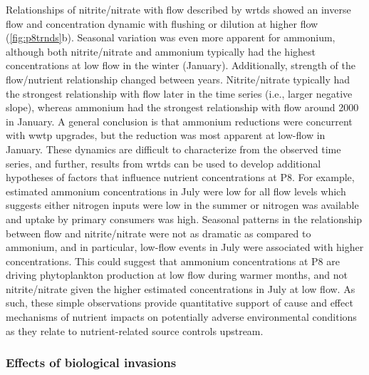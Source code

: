 \documentclass[journal = esthag, manuscript = article]{achemso}\usepackage[]{graphicx}\usepackage[]{color}
\begin{document}
Relationships of nitrite/nitrate with flow described by \ac{wrtds} showed an inverse flow and concentration dynamic with flushing or dilution at higher flow (\cref{fig:p8trnds}b).  Seasonal variation was even more apparent for ammonium, although both nitrite/nitrate and ammonium typically had the highest concentrations at low flow in the winter (January).  Additionally, strength of the flow/nutrient relationship changed between years. Nitrite/nitrate typically had the strongest relationship with flow later in the time series (i.e., larger negative slope), whereas ammonium had the strongest relationship with flow around 2000 in January. A general conclusion is that ammonium reductions were concurrent with \ac{wwtp} upgrades, but the reduction was most apparent at low-flow in January.  These dynamics are difficult to characterize from the observed time series, and further, results from \ac{wrtds} can be used to develop additional hypotheses of factors that influence nutrient concentrations at P8. For example, estimated ammonium concentrations in July were low for all flow levels which suggests either nitrogen inputs were low in the summer or nitrogen was available and uptake by primary consumers was high. Seasonal patterns in the relationship between flow and nitrite/nitrate were not as dramatic as compared to ammonium, and in particular, low-flow events in July were associated with higher concentrations.  This could suggest that ammonium concentrations at P8 are driving phytoplankton production at low flow during warmer months, and not nitrite/nitrate given the higher estimated concentrations in July at low flow. As such, these simple observations provide quantitative support of cause and effect mechanisms of nutrient impacts on potentially adverse environmental conditions as they relate to nutrient-related source controls upstream.

\subsubsection{Effects of biological invasions}
\end{document}
